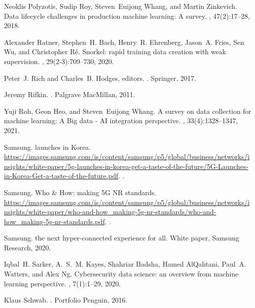 \documentclass[11pt]{article}
\begin{document}
\begin{thebibliography}{10}
Neoklis Polyzotis, Sudip Roy, Steven~Euijong Whang, and Martin Zinkevich.
\newblock Data lifecycle challenges in production machine learning: {A} survey.
, 47(2):17--28, 2018.

Alexander Ratner, Stephen~H. Bach, Henry~R. Ehrenberg, Jason~A. Fries, Sen Wu,
  and Christopher R{\'{e}}.
\newblock Snorkel: rapid training data creation with weak supervision.
, 29(2-3):709--730, 2020.

Peter~J. Rich and Charles~B. Hodges, editors.
.
\newblock Springer, 2017.

Jeremy Rifkin.
.
\newblock Palgrave MacMillan, 2011.

Yuji Roh, Geon Heo, and Steven~Euijong Whang.
\newblock A survey on data collection for machine learning: {A} {B}ig data -
  {AI} integration perspective.
, 33(4):1328--1347, 2021.

Samsung.
 launches in {K}orea.
\newblock
  \url{https://images.samsung.com/is/content/samsung/p5/global/business/networks/insights/white-paper/5g-launches-in-korea-get-a-taste-of-the-future/5G-Launches-in-Korea-Get-a-taste-of-the-future.pdf}.
.

Samsung.
\newblock Who \& {H}ow: making {5G} {NR} standards.
\newblock
  \url{https://images.samsung.com/is/content/samsung/p5/global/business/networks/insights/white-paper/who-and-how_making-5g-nr-standards/who-and-how_making-5g-nr-standards.pdf}.
.

Samsung.
 the next hyper-connected experience for all.
\newblock White paper, Samsung Research, 2020.

Iqbal~H. Sarker, A.~S.~M. Kayes, Shahriar Badsha, Hamed AlQahtani, Paul~A.
  Watters, and Alex Ng.
\newblock Cybersecurity data science: an overview from machine learning
  perspective.
, 7(1):1--29, 2020.

Klaus Schwab.
.
\newblock Portfolio Penguin, 2016.


\end{thebibliography}
\end{document}
